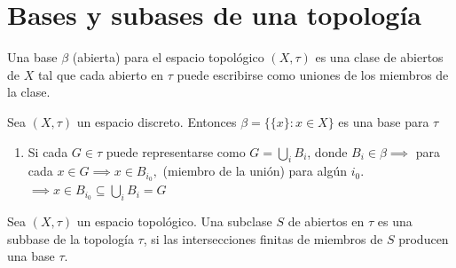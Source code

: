  
\section{Bases y subases de una topología}

\begin{definicion}
    Una base $\beta$ (abierta) para el espacio topológico $(X,\tau)$ es una clase de abiertos de $X$ tal que cada abierto en $\tau$ puede escribirse como uniones de los miembros de la clase. 
\end{definicion}

\begin{ejemplo}
    Sea $(X,\tau)$ un espacio discreto. Entonces $\beta = \{\{x\}:x\in X\}$ es una base para $\tau$
\end{ejemplo}

\begin{cajita}
    \begin{nota}
        \begin{enumerate}
            \item Si cada $G\in \tau$ puede representarse como $G=\bigcup_iB_i$, donde $B_i\in \beta\implies$ para cada $x\in G\implies x\in B_{i_0},$ (miembro de la unión) para algún $i_0$. $\implies x\in B_{i_0}\subseteq \bigcup_i B_i=G$
        \end{enumerate}
    \end{nota}
\end{cajita}

\begin{definicion}
    Sea $(X,\tau)$ un espacio topológico. Una subclase $S$ de abiertos en $\tau$ es una subbase de la topología $\tau$, si las intersecciones finitas de miembros de $S$ producen una base $\tau$. 
\end{definicion}

